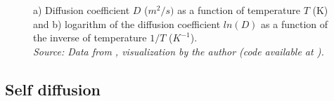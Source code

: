 \begin{figure}[h]
 \centering
 \captionsetup{justification=centering}
 \caption{a) Diffusion coefficient $D$ ($m^2/s)$ as a function of temperature $T$ (K) and b) logarithm of the diffusion coefficient $ln(D)$ as a function of the inverse of temperature $1/T$ ($K^{-1}$). \\
 \textit{Source: Data from \citep{kakusan}, visualization by the author (code available at \citep{mygit}).}}
 \label{fig:diffusion}
\end{figure}


\newpage
\subsection{Self diffusion}

